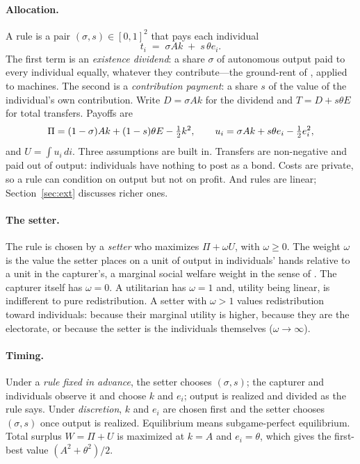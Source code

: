 \paragraph{Allocation.} A rule is a pair $(\sigma,s)\in[0,1]^2$ that pays each individual
\begin{equation}
  t_i \;=\; \sigma A k \;+\; s\,\theta e_i .
\end{equation}
The first term is an \emph{existence dividend}: a share $\sigma$ of autonomous output paid
to every individual equally, whatever they contribute---the ground-rent of
\citet{Paine1797}, applied to machines. The second is a \emph{contribution payment}: a
share $s$ of the value of the individual's own contribution. Write $D=\sigma A k$ for the
dividend and $T=D+s\theta E$ for total transfers. Payoffs are
\begin{equation}
  \Pi=(1-\sigma)Ak+(1-s)\theta E-\tfrac{1}{2} k^2, \qquad
  u_i=\sigma Ak+s\theta e_i-\tfrac{1}{2} e_i^2 ,
\end{equation}
and $U=\int u_i\,di$. Three assumptions are built in. Transfers are non-negative and paid
out of output: individuals have nothing to post as a bond. Costs are private, so a rule can
condition on output but not on profit. And rules are linear; Section~\ref{sec:ext}
discusses richer ones.

\paragraph{The setter.} The rule is chosen by a \emph{setter} who maximizes
$\Pi+\omega U$, with $\omega\ge 0$. The weight $\omega$ is the value the setter places on a
unit of output in individuals' hands relative to a unit in the capturer's, a marginal
social welfare weight in the sense of \citet{SaezStantcheva2016}. The capturer itself has
$\omega=0$. A utilitarian has $\omega=1$ and, utility being linear, is indifferent to pure
redistribution. A setter with $\omega>1$ values redistribution toward individuals: because
their marginal utility is higher, because they are the electorate, or because the setter
is the individuals themselves ($\omega\to\infty$).

\paragraph{Timing.} Under a \emph{rule fixed in advance}, the setter chooses $(\sigma,s)$;
the capturer and individuals observe it and choose $k$ and $e_i$; output is realized and
divided as the rule says. Under \emph{discretion}, $k$ and $e_i$ are chosen first and the
setter chooses $(\sigma,s)$ once output is realized. Equilibrium means subgame-perfect
equilibrium. Total surplus $W=\Pi+U$ is maximized at $k=A$ and $e_i=\theta$, which gives
the first-best value $(A^2+\theta^2)/2$.

